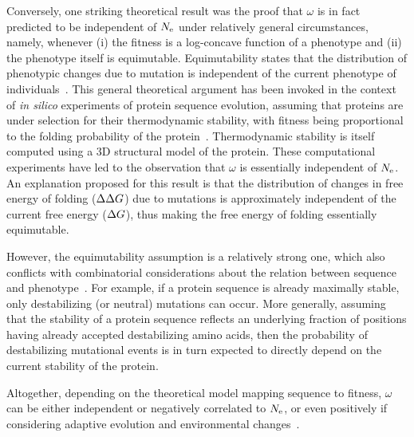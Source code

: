 Conversely, one striking theoretical result was the proof that $\omega$ is in fact predicted to be independent of $N_{\text{e}}$ under relatively general circumstances, namely, whenever (i) the fitness is a log-concave function of a {phenotype} and (ii) the {phenotype} itself is equimutable.
Equimutability states that the distribution of phenotypic changes due to mutation is independent of the current {phenotype} of individuals~\citep{Cherry1998}.
This general theoretical argument has been invoked in the context of \textit{in silico} experiments of protein sequence evolution, assuming that proteins are under selection for their thermodynamic stability, with fitness being proportional to the folding probability of the protein~\citep{Goldstein2013}.
Thermodynamic stability is itself computed using a 3D structural model of the protein.
These computational experiments have led to the observation that $\omega$ is essentially independent of $N_{\text{e}}$.
An explanation proposed for this result is that the distribution of changes in free energy of folding ($\Delta \Delta G$) due to mutations is approximately independent of the current free energy ($\Delta G$), thus making the free energy of folding essentially equimutable.

However, the equimutability assumption is a relatively strong one, which also conflicts with combinatorial considerations about the relation between sequence and phenotype~\citep{Serohijos2012}.
For example, if a protein sequence is already maximally stable, only destabilizing (or neutral) mutations can occur.
More generally, assuming that the stability of a protein sequence reflects an underlying fraction of positions having already accepted destabilizing amino acids, then the probability of destabilizing mutational events is in turn expected to directly depend on the current stability of the protein.

Altogether, depending on the theoretical model mapping sequence to fitness, $\omega$ can be either independent or negatively correlated to $N_{\text{e}}$, or even positively if considering adaptive evolution and environmental changes~\citep{Lanfear2014}.

